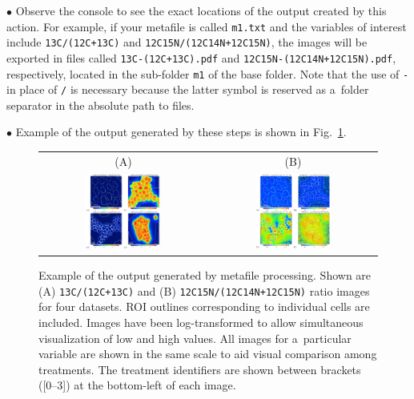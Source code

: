 \documentclass[a4paper, 11pt]{article}
\newcommand{\ttt}[1]{\texttt{#1}}
\newcommand{\lanstf}[1]{{\color{cyan}#1}}
\newcounter{step}
\newcommand\bul{\vskip5pt\noindent$\bullet${ }}
\begin{document}
\bul Observe the console to see the exact locations of the output created by this action. For example, if your metafile is called \ttt{m1.txt} and the variables of interest include \ttt{13C/(12C+13C)} and \ttt{12C15N/(12C14N+12C15N)}, the images will be exported in files called \ttt{13C-(12C+13C).pdf} and \ttt{12C15N-(12C14N+12C15N).pdf}, respectively, located in the sub-folder \ttt{m1} of the \lanstf{base folder}. Note that the use of \ttt{-} in place of \ttt{/} is necessary because the latter symbol is reserved as a~folder separator in the absolute path to files.

\bul Example of the output generated by these steps is shown in Fig.~\ref{fig:metafile-images}.

\begin{figure}[!ht]
\centering
\begin{tabular}{cc}
(A) & (B) \\
\includegraphics[width=0.47\textwidth, valign=t]{figs3/log(13C-(12C+13C))}
&
\includegraphics[width=0.47\textwidth, valign=t]{figs3/log(12C15N-(12C14N+12C15N))}
\end{tabular}
\caption{\label{fig:metafile-images}%
Example of the output generated by metafile processing. Shown are (A) \ttt{13C/(12C+13C)} and (B) \ttt{12C15N/(12C14N+12C15N)} ratio images for four datasets. ROI outlines corresponding to individual cells are included. Images have been log-transformed to allow simultaneous visualization of low and high values. All images for a~particular variable are shown in the same scale to aid visual comparison among treatments. The treatment identifiers are shown between brackets ([0--3]) at the bottom-left of each image.}
\end{figure}
\end{document}
